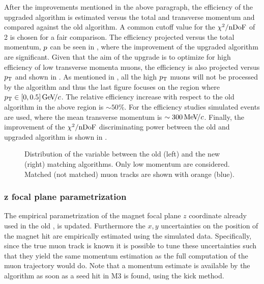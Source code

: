 After the improvements mentioned in the above paragraph, the efficiency of the upgraded \mvTTm algorithm
is estimated versus the total and transverse momentum and compared against the old algorithm. A common cutoff value for
the $\chi^2/{\rm nDoF}$ of 2 is chosen for a fair comparison. The efficiency projected versus the total momentum, $\mbox{$p$}$
can be seen in , where the improvement of the upgraded \mvTTm algorithm are significant.
Given that the aim of the \mvTTm upgrade is to optimize for high efficiency of low transverse momenta muons,
the efficiency is also projected versus $\mbox{$p_{\rm T}$}$ and shown in . As mentioned
in , all the high $\mbox{$p_{\rm T}$}$ muons will not be processed by the \mvTTm algorithm and thus
the last figure focuses on the region where $\mbox{$p_{\rm T}$}\in[0,0.5]{\mathrm{\,Ge\kern -0.1em V\!/}c}$. The relative efficiency increase with
respect to the old \mvm algorithm in the above region is $\sim 50\%$. For the efficiency studies \Sigmapmumu
simulated events are used, where the mean transverse momentum is $\sim 300{\mathrm{\,Me\kern -0.1em V\!/}c}$. Finally, the improvement
of the $\chi^2/{\rm nDoF}$ discriminating power between the old and upgraded algorithm is shown in .

\begin{figure}[t]
  \centering
  \begin{subfigure}{0.5\textwidth}
    \raggedright
    \scalebox{.6}{}
    \caption{}
    \label{mvTTm_chi2}
  \end{subfigure}%
  \hfill%
  \begin{subfigure}{0.5\textwidth}
    \raggedleft
    \scalebox{.6}{}
    \caption{}
    \label{mvm_chi2}
  \end{subfigure}
  \caption{Distribution of the \chisq variable between the old (left) and the new (right) matching algorithms.
           Only low momentum \veloTracks are considered. Matched (not matched) muon tracks are shown with orange (blue).}
 \label{mvm_chi2_comp}
\end{figure}

\subsubsection{z focal plane parametrization}
The empirical parametrization of the magnet focal plane $z$ coordinate already used in the old \mvm \cite{roelThesis},
is updated. Furthermore the $x,y$ uncertainties on the position of the magnet hit are empirically estimated using the simulated data.
Specifically, since the true muon track is known it is possible to tune these uncertainties such that they yield the same momentum
estimation as the full computation of the muon trajectory would do. Note that a momentum estimate is available by the
\mvTTm algorithm as soon as a seed hit in M3 is found, using the kick method.

